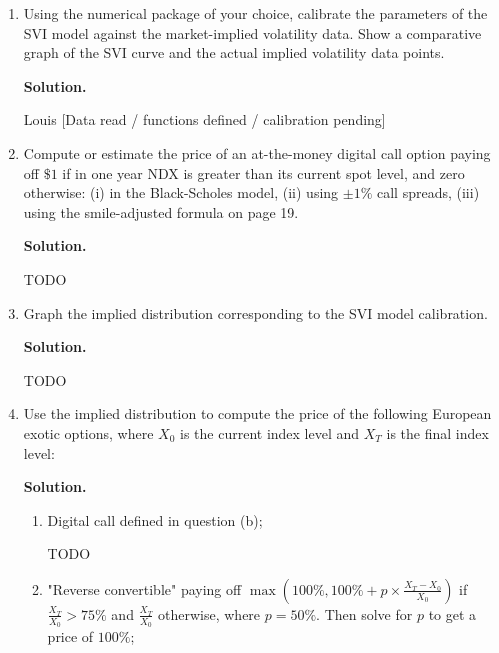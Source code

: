 \documentclass[12pt]{article}
\newenvironment{solution}{\vspace{0.2cm} \textbf{Solution.}}{}
\begin{document}
	\begin{enumerate}[label=(\alph*)]

		\item Using the numerical package of your choice, calibrate the parameters of the SVI model against the market-implied volatility data. Show a comparative graph of the SVI curve and the actual implied volatility data points.

		\begin{solution}

		Louis [Data read / functions defined / calibration pending]

		\end{solution}

		\item Compute or estimate the price of an at-the-money digital call option paying off $\$1$ if in one year NDX is greater than its current spot level, and zero otherwise: (i) in the Black-Scholes model, (ii) using $\pm 1\%$ call spreads, (iii) using the smile-adjusted formula on page 19.

		\begin{solution}

			TODO

		\end{solution}

		\item Graph the implied distribution corresponding to the SVI model calibration.

		\begin{solution}

			TODO

		\end{solution}

		\item Use the implied distribution to compute the price of the following European exotic options, where $X_0$ is the current index level and $X_T$ is the final index level:

		\begin{solution}

			\begin{enumerate}[label=(\roman*)]

				\item Digital call defined in question (b);

				TODO

				\item "Reverse convertible" paying off $\max\left(100\%, 100\% + p \times \frac{X_T- X_0}{X_0}\right)$ if $\frac{X_T}{X_0} > 75 \%$ and $\frac{X_T}{X_0}$ otherwise, where $p = 50\%$. Then solve for $p$ to get a price of $100\%$;


\end{enumerate}
\end{solution}
\end{enumerate}
\end{document}
